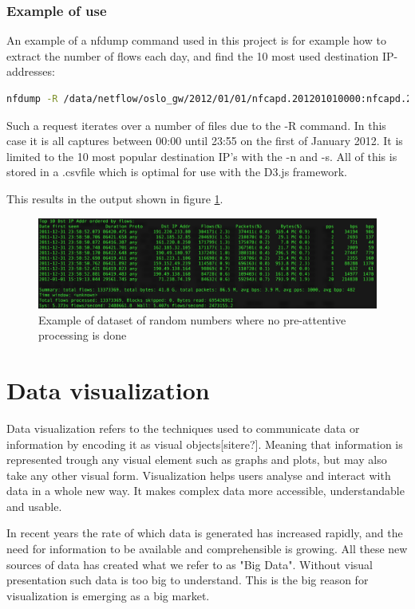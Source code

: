 \subsubsection{Example of use}
An example of a nfdump command used in this project is for example how to extract the number of flows each day, and find the 10 most used destination IP-addresses:

\begin{lstlisting}[language=bash]
nfdump -R /data/netflow/oslo_gw/2012/01/01/nfcapd.201201010000:nfcapd.201201012355 -n 10 -s dstip -o csv > example.csv
\end{lstlisting}

Such a request iterates over a number of files due to the -R command. In this case it is all captures between 00:00 until 23:55 on the first of January 2012. It is limited to the 10 most popular destination IP's with the -n and -s. All of this is stored in a .\gls{csv}file which is optimal for use with the D3.js framework. 

This results in the output shown in figure \ref{top10example}.

\begin{figure}[h!]
\includegraphics[scale=0.4]{top10example}
\caption{Example of dataset of random numbers where no pre-attentive processing is done}
\label{top10example}
\end{figure}



\section{Data visualization}
Data visualization refers to the techniques used to communicate data or information by encoding it as visual objects[sitere?]. Meaning that information is represented trough any visual element such as graphs and plots, but may also take any other visual form. Visualization helps users analyse and interact with data in a whole new way. It makes complex data more accessible, understandable and usable.\cite{friedman}

In recent years the rate of which data is generated has increased rapidly, and the need for information to be available and comprehensible is growing. All these new sources of data has created what we refer to as "Big Data". Without visual presentation such data is too big to understand. This is the big reason for visualization is emerging as a big market. 

